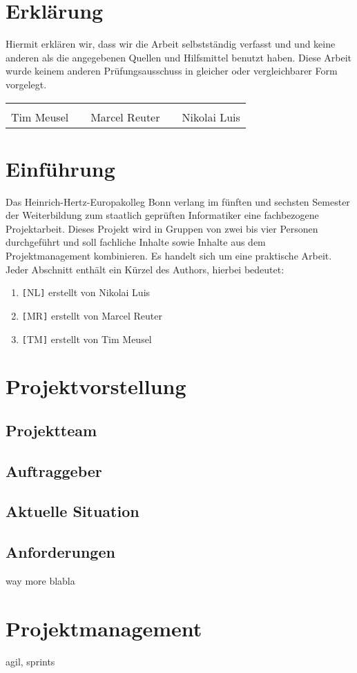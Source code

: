 \section{Erklärung}
Hiermit erklären wir, dass wir die Arbeit selbstständig verfasst und und keine
anderen als die angegebenen Quellen und Hilfsmittel benutzt haben. Diese Arbeit
wurde keinem anderen Prüfungsausschuss in gleicher oder vergleichbarer Form
vorgelegt.

\vfill
{\centering
\renewcommand{\arraystretch}{0.9}
\begin{tabular}{p{}p{}p{}p{}p{}}
  \dotfill                    & & \dotfill                      & & \dotfill \\
  \centering\footnotesize{Tim Meusel}& & \centering\footnotesize{Marcel Reuter}& & \centering\footnotesize{Nikolai Luis}%
\end{tabular}
}

\newpage

\section{Einführung}
Das Heinrich-Hertz-Europakolleg Bonn verlang im fünften und sechsten Semester
der Weiterbildung zum staatlich geprüften Informatiker eine fachbezogene
Projektarbeit. Dieses Projekt wird in Gruppen von zwei bis vier Personen
durchgeführt und soll fachliche Inhalte sowie Inhalte aus dem Projektmanagement
kombinieren. Es handelt sich um eine praktische Arbeit. Jeder Abschnitt enthält
ein Kürzel des Authors, hierbei bedeutet:
\begin{enumerate}
  \item \verb+[+NL\verb+]+ erstellt von Nikolai Luis
  \item \verb+[+MR\verb+]+ erstellt von Marcel Reuter
  \item \verb+[+TM\verb+]+ erstellt von Tim Meusel
\end{enumerate}

\section{Projektvorstellung}
\subsection{Projektteam}
\subsection{Auftraggeber}
\subsection{Aktuelle Situation}
\subsection{Anforderungen}

\cite{lee2013introduction}
way more blabla

\section{Projektmanagement}
agil, sprints

\printbibliography
